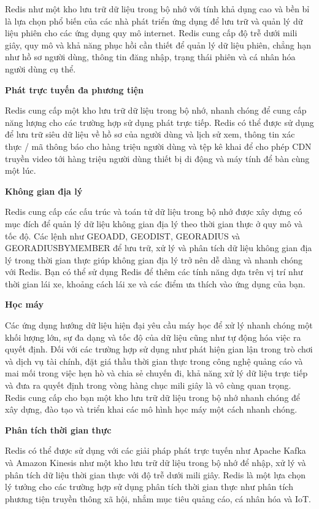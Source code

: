 Redis như một kho lưu trữ dữ liệu trong bộ nhớ với tính khả dụng cao và bền bỉ là lựa chọn phổ biến của các nhà phát triển ứng dụng để lưu trữ và quản lý dữ liệu phiên cho các ứng dụng quy mô internet. Redis cung cấp độ trễ dưới mili giây, quy mô và khả năng phục hồi cần thiết để quản lý dữ liệu phiên, chẳng hạn như hồ sơ người dùng, thông tin đăng nhập, trạng thái phiên và cá nhân hóa người dùng cụ thể.

\textbf{Phát trực tuyến đa phương tiện}

Redis cung cấp một kho lưu trữ dữ liệu trong bộ nhớ, nhanh chóng để cung cấp năng lượng cho các trường hợp sử dụng phát trực tiếp. Redis có thể được sử dụng để lưu trữ siêu dữ liệu về hồ sơ của người dùng và lịch sử xem, thông tin xác thực / mã thông báo cho hàng triệu người dùng và tệp kê khai để cho phép CDN truyền video tới hàng triệu người dùng thiết bị di động và máy tính để bàn cùng một lúc.

\textbf{Không gian địa lý}

Redis cung cấp các cấu trúc và toán tử dữ liệu trong bộ nhớ được xây dựng có mục đích để quản lý dữ liệu không gian địa lý theo thời gian thực ở quy mô và tốc độ. Các lệnh như GEOADD, GEODIST, GEORADIUS và GEORADIUSBYMEMBER để lưu trữ, xử lý và phân tích dữ liệu không gian địa lý trong thời gian thực giúp không gian địa lý trở nên dễ dàng và nhanh chóng với Redis. Bạn có thể sử dụng Redis để thêm các tính năng dựa trên vị trí như thời gian lái xe, khoảng cách lái xe và các điểm ưa thích vào ứng dụng của bạn.

\textbf{Học máy}

Các ứng dụng hướng dữ liệu hiện đại yêu cầu máy học để xử lý nhanh chóng một khối lượng lớn, sự đa dạng và tốc độ của dữ liệu cũng như tự động hóa việc ra quyết định. Đối với các trường hợp sử dụng như phát hiện gian lận trong trò chơi và dịch vụ tài chính, đặt giá thầu thời gian thực trong công nghệ quảng cáo và mai mối trong việc hẹn hò và chia sẻ chuyến đi, khả năng xử lý dữ liệu trực tiếp và đưa ra quyết định trong vòng hàng chục mili giây là vô cùng quan trọng. Redis cung cấp cho bạn một kho lưu trữ dữ liệu trong bộ nhớ nhanh chóng để xây dựng, đào tạo và triển khai các mô hình học máy một cách nhanh chóng.

\textbf{Phân tích thời gian thực}

Redis có thể được sử dụng với các giải pháp phát trực tuyến như Apache Kafka và Amazon Kinesis như một kho lưu trữ dữ liệu trong bộ nhớ để nhập, xử lý và phân tích dữ liệu thời gian thực với độ trễ dưới mili giây. Redis là một lựa chọn lý tưởng cho các trường hợp sử dụng phân tích thời gian thực như phân tích phương tiện truyền thông xã hội, nhắm mục tiêu quảng cáo, cá nhân hóa và IoT.


